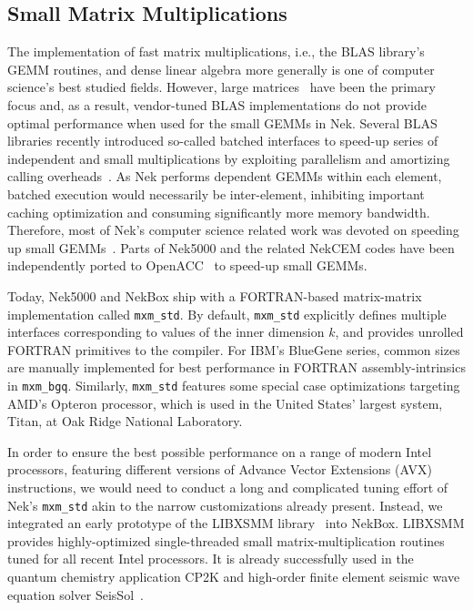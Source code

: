 
\subsection{Small Matrix Multiplications}

The implementation of fast matrix multiplications, i.e., the BLAS library's GEMM routines, and dense linear algebra more generally is one of computer science's best studied fields. 
However, large matrices~\cite{Goto:2008:AHM:1356052.1356053} have been the primary focus and, as a result, vendor-tuned BLAS implementations do not provide optimal performance when used for the small GEMMs in Nek. 
Several BLAS libraries recently introduced so-called batched interfaces to speed-up series of independent and small multiplications by exploiting parallelism and amortizing calling overheads~\cite{mklbatch}. 
As Nek performs dependent GEMMs within each element, batched execution would necessarily be inter-element,  inhibiting important caching optimization and consuming significantly more memory bandwidth. 
Therefore, most of Nek's computer science related work was devoted on speeding up small GEMMs~\cite{Shin:2010:SUN:1810085.1810120}.
Parts of Nek5000 and the related NekCEM codes have been independently ported to OpenACC~\cite{markidis2015openacc, otten2016} to speed-up small GEMMs.

Today, Nek5000 and NekBox ship with a FORTRAN-based matrix-matrix implementation called \texttt{mxm\_std}.
By default, \texttt{mxm\_std} explicitly defines multiple interfaces corresponding to values of the inner dimension $k$, and provides unrolled FORTRAN primitives to the compiler.
 For IBM's BlueGene series, common sizes are manually implemented for best performance in FORTRAN assembly-intrinsics in \texttt{mxm\_bgq}. 
Similarly, \texttt{mxm\_std} features some special case optimizations targeting AMD's Opteron processor, which is used in the United States' largest system, Titan, at Oak Ridge National Laboratory.

In order to ensure the best possible performance on a range of modern Intel processors, featuring different versions of Advance Vector Extensions (AVX) instructions, we would need to conduct a long and complicated tuning effort of Nek's \texttt{mxm\_std} akin to the narrow customizations already present.
Instead, we integrated an early prototype of the LIBXSMM library~\cite{LIBXSMM,sc15poster} into NekBox. 
LIBXSMM provides highly-optimized single-threaded small matrix-multiplication routines tuned for all recent Intel processors. 
It is already successfully used in the quantum chemistry application CP2K and high-order finite element seismic wave equation solver SeisSol~\cite{breuer15high-order}. 


